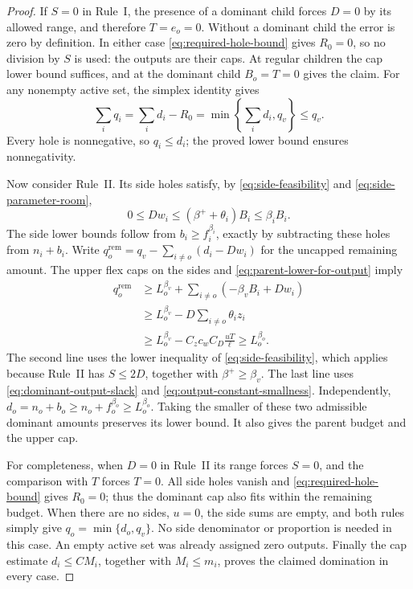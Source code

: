 \begin{proof}
If \(S=0\) in Rule~I, the presence of a dominant child forces \(D=0\)
by its allowed range, and therefore \(T=e_o=0\).  Without a dominant
child the error is zero by definition.  In either case
\eqref{eq:required-hole-bound} gives \(R_0=0\), so no division by \(S\)
is used: the outputs are their caps.  At regular children the cap lower
bound suffices, and at the dominant child \(B_o=T=0\) gives the claim.
For any nonempty active set, the simplex identity gives
\[
 \sum_iq_i=\sum_i d_i-R_0
          =\min\left\{\sum_i d_i,q_v\right\}\le q_v.
\]
Every hole is nonnegative, so \(q_i\le d_i\); the proved lower bound
ensures nonnegativity.

Now consider Rule~II.  Its side holes satisfy, by
\eqref{eq:side-feasibility} and \eqref{eq:side-parameter-room},
\[
 0\le Dw_i\le(\beta^++\theta_i)B_i\le\beta_iB_i.
\]
The side lower bounds follow from \(b_i\ge f_i^{\beta_i}\), exactly
by subtracting these holes from \(n_i+b_i\).  Write
\(q_o^{\mathrm{rem}}=q_v-\sum_{i\ne o}(d_i-Dw_i)\) for the
uncapped remaining amount.  The upper flex caps on the sides and
\eqref{eq:parent-lower-for-output} imply
\begin{align*}
 q_o^{\mathrm{rem}}
 &\ge L_o^{\beta_v}
        +\sum_{i\ne o}(-\beta_vB_i+Dw_i)\\
 &\ge L_o^{\beta_v}-D\sum_{i\ne o}\theta_i z_i\\
 &\ge L_o^{\beta_v}-C_zc_wC_D\frac{uT}{\ell}
 \ge L_o^{\beta_o}.
\end{align*}
The second line uses the lower inequality of
\eqref{eq:side-feasibility}, which applies because Rule~II has
\(S\le2D\), together with \(\beta^+\ge\beta_v\).  The last line
uses \eqref{eq:dominant-output-slack} and
\eqref{eq:output-constant-smallness}.  Independently,
\(d_o=n_o+b_o\ge n_o+f_o^{\beta_o}\ge L_o^{\beta_o}\).
Taking the smaller of these two admissible dominant amounts preserves
its lower bound.  It also gives the parent budget and the upper cap.

For completeness, when \(D=0\) in Rule~II its range forces \(S=0\),
and the comparison with \(T\) forces \(T=0\).  All side holes vanish
and \eqref{eq:required-hole-bound} gives \(R_0=0\); thus the dominant
cap also fits within the remaining budget.  When there are no sides,
\(u=0\), the side sums are empty, and both rules simply give
\(q_o=\min\{d_o,q_v\}\).  No side denominator or proportion is needed
in this case.  An empty active set was already assigned zero outputs.
Finally the cap estimate \(d_i\le CM_i\), together with
\(M_i\le m_i\), proves the claimed domination in every case.
\end{proof}

